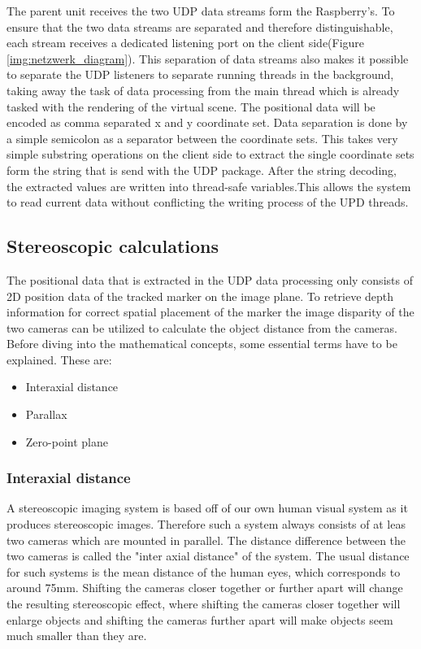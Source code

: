 The parent unit receives the two UDP data streams form the Raspberry's. To ensure that the two data streams are separated and therefore distinguishable, each stream receives a dedicated listening port on the client side(Figure \ref{img:netzwerk_diagram}). This separation of data streams also makes it possible to separate the UDP listeners to separate running threads in the background, taking away the task of data processing from the main thread which is already tasked with the rendering of the virtual scene. The positional data will be encoded as comma separated x and y coordinate set. Data separation is done by a simple semicolon as a separator between the coordinate sets. This takes very simple substring operations on the client side to extract the single coordinate sets form the string that is send with the UDP package.
After the string decoding, the extracted values are written into thread-safe variables.This allows the system to read current data without conflicting the writing process of the UPD threads.
\subsection{Stereoscopic calculations}
The positional data that is extracted in the UDP data processing only consists of 2D position data of the tracked marker on the image plane. To retrieve depth information for correct spatial placement of the marker the image disparity of the two cameras can be utilized to calculate the object distance from the cameras.\cite{Tauer.2010}\\
Before diving into the mathematical concepts, some essential terms have to be explained.
These are:
\begin{itemize}
\item Interaxial distance
\item Parallax
\item Zero-point plane
\end{itemize}
\subsubsection{Interaxial distance}
A stereoscopic imaging system is based off of our own human visual system as it produces stereoscopic images. Therefore such a system always consists of at leas two cameras which are mounted in parallel. The distance difference between the two cameras is called the "inter axial distance" of the system. The usual distance for such systems is the mean distance of the human eyes, which corresponds to around 75mm. Shifting the cameras closer together or further apart will change the resulting stereoscopic effect, where shifting the cameras closer together will enlarge objects and shifting the cameras further apart will make objects seem much smaller than they are. 

